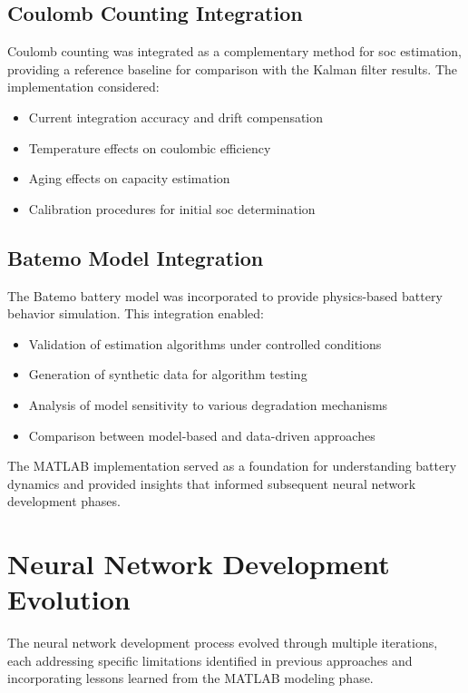 \subsection{Coulomb Counting Integration}

Coulomb counting was integrated as a complementary method for \gls{soc} estimation, providing a reference baseline for comparison with the Kalman filter results. The implementation considered:

\begin{itemize}
    \item Current integration accuracy and drift compensation
    \item Temperature effects on coulombic efficiency
    \item Aging effects on capacity estimation
    \item Calibration procedures for initial \gls{soc} determination
\end{itemize}

\subsection{Batemo Model Integration}

The Batemo battery model was incorporated to provide physics-based battery behavior simulation. This integration enabled:

\begin{itemize}
    \item Validation of estimation algorithms under controlled conditions
    \item Generation of synthetic data for algorithm testing
    \item Analysis of model sensitivity to various degradation mechanisms
    \item Comparison between model-based and data-driven approaches
\end{itemize}

The MATLAB implementation served as a foundation for understanding battery dynamics and provided insights that informed subsequent neural network development phases.

\section{Neural Network Development Evolution}

The neural network development process evolved through multiple iterations, each addressing specific limitations identified in previous approaches and incorporating lessons learned from the MATLAB modeling phase.

